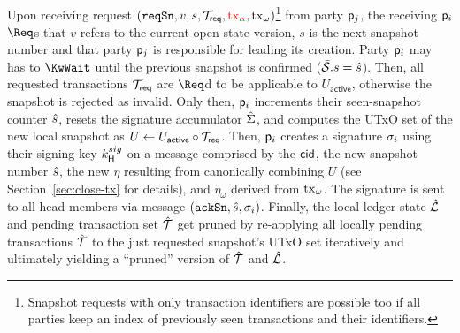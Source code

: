  \\

 \\

\quad Upon receiving request
$(\mathtt{reqSn},v,s,{\mathcal T}_{\mathsf{req}}, \textcolor{red}{\mathrm{tx}_\alpha}, \mathrm{tx}_\omega)$\footnote{Snapshot requests
	with only transaction identifiers are possible too if all parties keep an
	index of previously seen transactions and their identifiers.} from party
$\mathsf p_j$, the receiving $\mathsf p_i$ $\Req$s that $v$ refers to the current
open state version, $s$ is the next snapshot number
and that party $\mathsf p_j$ is responsible for leading its creation. Party $\mathsf p_i$ may has to $\KwWait$ until the previous snapshot is
  confirmed ($\bar{\mathcal S}.s = \hat s$).
  Then, all requested transactions ${\mathcal T}_{\mathsf{req}}$ are $\Req$d to be applicable
  to $U_{\mathsf{active}}$,
  otherwise the snapshot is rejected as invalid. Only then, $\mathsf p_i$ increments
  their seen-snapshot counter $\hat s$, resets the signature accumulator
  $\hat{\Sigma}$, and computes the UTxO set of the new local snapshot as
  $U \gets U_{\mathsf{active}} \circ {\mathcal T}_{\mathsf{req}}$. Then, $\mathsf p_i$
  creates a signature $\sigma_i$ using their signing key $k^{sig}_\mathsf{H}$ on a
  message comprised by the $\mathsf{cid}$, the new snapshot number $\hat s$, the new $\eta$
  resulting from canonically combining $U$ (see Section~\ref{sec:close-tx} for
  details),  and $\eta_\omega$ derived from $\mathrm{tx}_\omega$.
  The signature is sent to all head members via message $(\mathtt{ackSn},\hat s,\sigma_i)$.
  Finally, the local ledger state $\hat {\mathcal L}$ and pending transaction set $\hat {\mathcal T}$
  get pruned by re-applying all locally pending transactions $\hat {\mathcal T}$ to the just
  requested snapshot's UTxO set iteratively and
  ultimately yielding a ``pruned'' version of $\hat {\mathcal T}$ and $\hat {\mathcal L}$. \\

